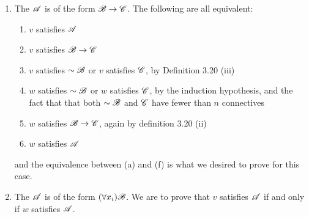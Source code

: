 \begin{proposition}
\begin{enumerate}
    \item The \wf{} \(\mathscr{A}\) is of the form \(\mathscr{B} \rightarrow \mathscr{C}\). The following are all equivalent:
      \begin{enumerate}[align=left]
        \item \(v\) satisfies \(\mathscr{A}\)
        \item \(v\) satisfies \(\mathscr{B} \rightarrow \mathscr{C}\)
        \item \(v\) satisfies \(\sim\mathscr{B}\) or \(v\) satisfies \(\mathscr{C}\), by Definition 3.20 (iii)
        \item \(w\) satisfies \(\sim\mathscr{B}\) or \(w\) satisfies \(\mathscr{C}\), by the induction hypothesis, and the fact that that both \(\sim\mathscr{B}\) and \(\mathscr{C}\) have fewer than \(n\) connectives
        \item \(w\) satisfies \(\mathscr{B} \rightarrow \mathscr{C}\), again by definition 3.20 (ii)
        \item \(w\) satisfies \(\mathscr{A}\)
      \end{enumerate}
      and the equivalence between (a) and (f) is what we desired to prove for this case.

    \item The \wf{} \(\mathscr{A}\) is of the form \((\forall x_i) \mathscr{B}\). We are to prove that \(v\) satisfies \(\mathscr{A}\) if and only if \(w\) satisfies \(\mathscr{A}\).


\end{enumerate}
\end{proposition}
